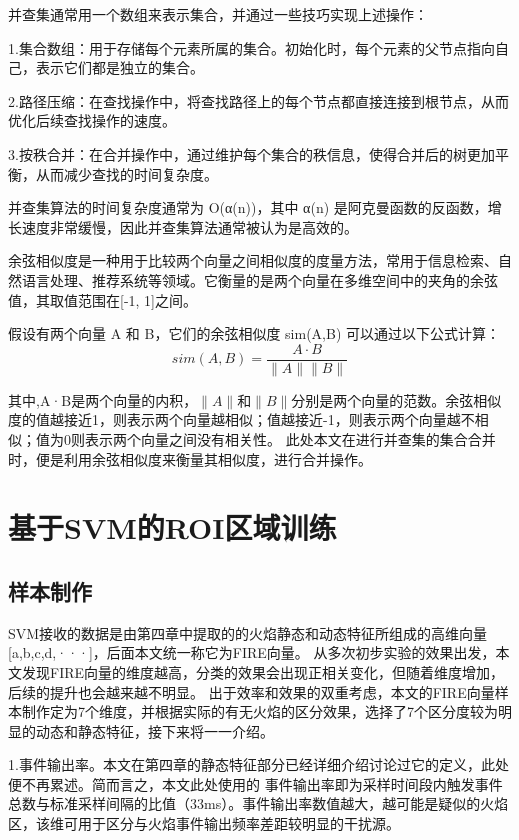 并查集通常用一个数组来表示集合，并通过一些技巧实现上述操作：

1.集合数组：用于存储每个元素所属的集合。初始化时，每个元素的父节点指向自己，表示它们都是独立的集合。

2.路径压缩：在查找操作中，将查找路径上的每个节点都直接连接到根节点，从而优化后续查找操作的速度。

3.按秩合并：在合并操作中，通过维护每个集合的秩信息，使得合并后的树更加平衡，从而减少查找的时间复杂度。

并查集算法的时间复杂度通常为 O(α(n))，其中 α(n) 是阿克曼函数的反函数，增长速度非常缓慢，因此并查集算法通常被认为是高效的。

余弦相似度是一种用于比较两个向量之间相似度的度量方法，常用于信息检索、自然语言处理、推荐系统等领域。它衡量的是两个向量在多维空间中的夹角的余弦值，其取值范围在[-1, 1]之间。

假设有两个向量 A 和 B，它们的余弦相似度 sim(A,B) 可以通过以下公式计算：
\begin{equation} 
    sim(A,B)=\frac{A·B}{\lVert A \rVert \lVert B \rVert}
\end{equation}

其中,A·B是两个向量的内积，$\lVert A \rVert$和$\lVert B \rVert$分别是两个向量的范数。余弦相似度的值越接近1，则表示两个向量越相似；值越接近-1，则表示两个向量越不相似；值为0则表示两个向量之间没有相关性。
此处本文在进行并查集的集合合并时，便是利用余弦相似度来衡量其相似度，进行合并操作。


\section{基于SVM的ROI区域训练}
\subsection{样本制作}
SVM接收的数据是由第四章中提取的的火焰静态和动态特征所组成的高维向量[a,b,c,d,···]，后面本文统一称它为FIRE向量。
从多次初步实验的效果出发，本文发现FIRE向量的维度越高，分类的效果会出现正相关变化，但随着维度增加，后续的提升也会越来越不明显。
出于效率和效果的双重考虑，本文的FIRE向量样本制作定为7个维度，并根据实际的有无火焰的区分效果，选择了7个区分度较为明显的动态和静态特征，接下来将一一介绍。

1.事件输出率。本文在第四章的静态特征部分已经详细介绍讨论过它的定义，此处便不再累述。简而言之，本文此处使用的
事件输出率即为采样时间段内触发事件总数与标准采样间隔的比值（33ms）。事件输出率数值越大，越可能是疑似的火焰区，该维可用于区分与火焰事件输出频率差距较明显的干扰源。

